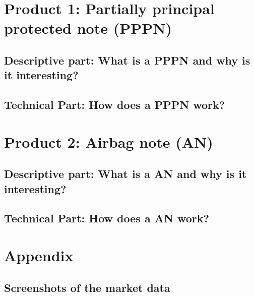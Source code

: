 \documentclass[11pt,oneside,a4paper]{article}
\makeatletter
\def\cleardoublepage{\clearpage\if@twoside \ifodd\c@page\else%
	\hbox{}%
	\thispagestyle{empty}%
	\clearpage%
	\if@twocolumn\hbox{}\clearpage\fi\fi\fi}
\makeatother
\begin{document}
	\section{Product 1: Partially principal protected note (PPPN)}
	\subsection{Descriptive part: What is a PPPN and why is it interesting?}
	\subsection{Technical Part: How does a PPPN work?}
	\newpage
	\section{Product 2: Airbag note (AN)}
	\subsection{Descriptive part: What is a AN and why is it interesting?}
	\subsection{Technical Part: How does a AN work?}
	\cleardoublepage
	\section{Appendix}
	\subsection{Screenshots of the market data}
	
	\newpage
	
	
\end{document}
